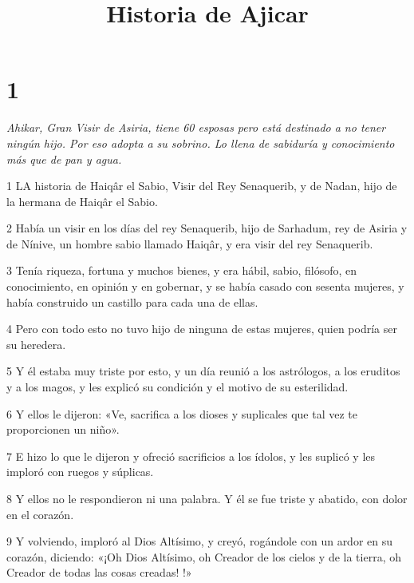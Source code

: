

\title{Historia de Ajicar}

\chapter{1}

\par \textit{Ahikar, Gran Visir de Asiria, tiene 60 esposas pero está destinado a no tener ningún hijo. Por eso adopta a su sobrino. Lo llena de sabiduría y conocimiento más que de pan y agua.}

\par 1 LA historia de Haiqâr el Sabio, Visir del Rey Senaquerib, y de Nadan, hijo de la hermana de Haiqâr el Sabio.

\par 2 Había un visir en los días del rey Senaquerib, hijo de Sarhadum, rey de Asiria y de Nínive, un hombre sabio llamado Haiqâr, y era visir del rey Senaquerib.

\par 3 Tenía riqueza, fortuna y muchos bienes, y era hábil, sabio, filósofo, en conocimiento, en opinión y en gobernar, y se había casado con sesenta mujeres, y había construido un castillo para cada una de ellas.

\par 4 Pero con todo esto no tuvo hijo de ninguna de estas mujeres, quien podría ser su heredera.

\par 5 Y él estaba muy triste por esto, y un día reunió a los astrólogos, a los eruditos y a los magos, y les explicó su condición y el motivo de su esterilidad.

\par 6 Y ellos le dijeron: «Ve, sacrifica a los dioses y suplicales que tal vez te proporcionen un niño».

\par 7 E hizo lo que le dijeron y ofreció sacrificios a los ídolos, y les suplicó y les imploró con ruegos y súplicas.

\par 8 Y ellos no le respondieron ni una palabra. Y él se fue triste y abatido, con dolor en el corazón.

\par 9 Y volviendo, imploró al Dios Altísimo, y creyó, rogándole con un ardor en su corazón, diciendo: «¡Oh Dios Altísimo, oh Creador de los cielos y de la tierra, oh Creador de todas las cosas creadas! !»

